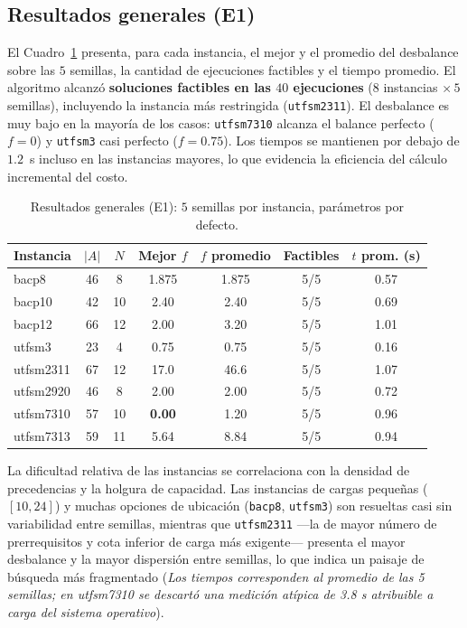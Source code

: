 \documentclass[letter, 10pt]{article}
\begin{document}
\subsection{Resultados generales (E1)}
El Cuadro~\ref{tab:e1} presenta, para cada instancia, el mejor y el promedio del desbalance sobre las $5$ semillas, la cantidad de ejecuciones factibles y el tiempo promedio. El algoritmo alcanz\'o \textbf{soluciones factibles en las $40$ ejecuciones} ($8$ instancias $\times\,5$ semillas), incluyendo la instancia m\'as restringida (\texttt{utfsm2311}). El desbalance es muy bajo en la mayor\'ia de los casos: \texttt{utfsm7310} alcanza el balance perfecto ($f=0$) y \texttt{utfsm3} casi perfecto ($f=0.75$). Los tiempos se mantienen por debajo de $1.2$~s incluso en las instancias mayores, lo que evidencia la eficiencia del c\'alculo incremental del costo.

\begin{table}[h]
\centering
\begin{tabular}{lcccccc}
\hline
Instancia & $|A|$ & $N$ & Mejor $f$ & $f$ promedio & Factibles & $t$ prom. (s) \\
\hline
bacp8     & 46 & 8  & 1.875 & 1.875 & 5/5 & 0.57 \\
bacp10    & 42 & 10 & 2.40  & 2.40  & 5/5 & 0.69 \\
bacp12    & 66 & 12 & 2.00  & 3.20  & 5/5 & 1.01 \\
utfsm3    & 23 & 4  & 0.75  & 0.75  & 5/5 & 0.16 \\
utfsm2311 & 67 & 12 & 17.0  & 46.6  & 5/5 & 1.07 \\
utfsm2920 & 46 & 8  & 2.00  & 2.00  & 5/5 & 0.72 \\
utfsm7310 & 57 & 10 & \textbf{0.00}  & 1.20  & 5/5 & 0.96 \\
utfsm7313 & 59 & 11 & 5.64  & 8.84  & 5/5 & 0.94 \\
\hline
\end{tabular}
\caption{Resultados generales (E1): $5$ semillas por instancia, par\'ametros por defecto.}
\label{tab:e1}
\end{table}

La dificultad relativa de las instancias se correlaciona con la densidad de precedencias y la holgura de capacidad. Las instancias de cargas peque\~nas ($[10,24]$) y muchas opciones de ubicaci\'on (\texttt{bacp8}, \texttt{utfsm3}) son resueltas casi sin variabilidad entre semillas, mientras que \texttt{utfsm2311} ---la de mayor n\'umero de prerrequisitos y cota inferior de carga m\'as exigente--- presenta el mayor desbalance y la mayor dispersi\'on entre semillas, lo que indica un paisaje de b\'usqueda m\'as fragmentado (\textit{Los tiempos corresponden al promedio de las 5 semillas; en utfsm7310 se descart\'o una medici\'on at\'ipica de 3.8 s atribuible a carga del sistema operativo}).
\end{document}
